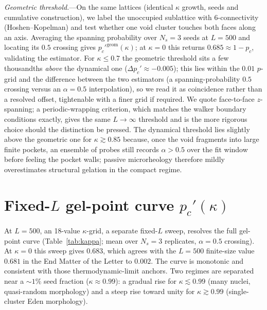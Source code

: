 \documentclass[aps,prl,twocolumn,superscriptaddress,floatfix,nofootinbib,longbibliography]{revtex4-2}
\newcommand{\pc}{p_c}
\newcommand{\pcp}{p_c'}
\newcommand{\kap}{\kappa}
\begin{document}
\emph{Geometric threshold.}---On the same lattices (identical $\kap$ growth, seeds and cumulative
construction), we label the unoccupied sublattice with 6-connectivity (Hoshen--Kopelman) and test
whether one void cluster touches both faces along an axis. Averaging the spanning probability over
$N_s=3$ seeds at $L=500$ and locating its $0.5$ crossing gives $\pcp^{\mathrm{geom}}(\kap)$; at
$\kap=0$ this returns $0.685\approx1-\pc$, validating the estimator. For $\kap\le0.7$ the geometric
threshold sits a few thousandths \emph{above} the dynamical one ($\Delta\pcp\approx-0.005$); this lies
within the $0.01$ $p$-grid and the difference between the two estimators (a spanning-probability $0.5$
crossing versus an $\alpha=0.5$ interpolation), so we read it as coincidence rather than a resolved
offset, tightenable with a finer grid if required. We quote face-to-face $z$-spanning; a
periodic-wrapping criterion, which matches the walker boundary conditions exactly, gives the same
$L\to\infty$ threshold and is the more rigorous choice should the distinction be pressed. The
dynamical threshold lies slightly
above the geometric one for $\kap\gtrsim0.85$ because, once the void fragments into large finite
pockets, an ensemble of probes still records $\alpha>0.5$ over the fit window before feeling the
pocket walls; passive microrheology therefore mildly overestimates structural gelation in the compact
regime.

\section{Fixed-$L$ gel-point curve $\pcp(\kap)$}
At $L=500$, an 18-value $\kap$-grid, a separate fixed-$L$ sweep, resolves the full gel-point curve (Table~\ref{tab:kappa};
mean over $N_s=3$ replicates, $\alpha=0.5$ crossing). At $\kap=0$ this sweep gives $0.683$, which agrees with the $L=500$ finite-size value $0.681$ in the End Matter of the Letter to $0.002$. The curve is monotonic and consistent with those thermodynamic-limit anchors. Two regimes are separated near a $\sim1\%$
seed fraction ($\kap\approx0.99$): a gradual rise for $\kap\lesssim0.99$ (many nuclei,
quasi-random morphology) and a steep rise toward unity for $\kap\gtrsim0.99$ (single-cluster
Eden morphology).
\end{document}
